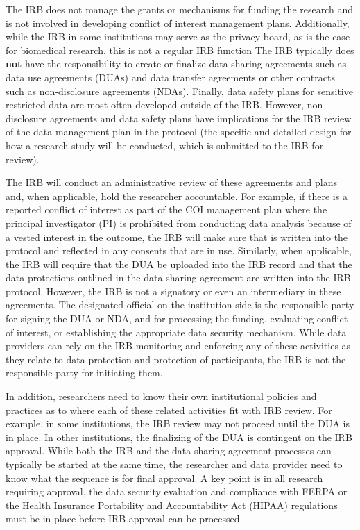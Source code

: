 The IRB does not manage the grants or mechanisms for funding the research and is not involved in developing conflict of interest management plans. Additionally, while the IRB in some institutions may serve as the privacy board, as is the case for biomedical research, this is not a regular IRB function The IRB typically does \textbf{not} have the responsibility to create or finalize data sharing agreements such as data use agreements (DUAs) and data transfer agreements or other contracts such as non-disclosure agreements (NDAs). Finally, data safety plans for sensitive restricted data are most often developed outside of the IRB. However, non-disclosure agreements and data safety plans have implications for the IRB review of the data management plan in the protocol (the specific and detailed design for how a research study will be conducted, which is submitted to the IRB for review).

The IRB will conduct an administrative review of these agreements and plans and, when applicable, hold the researcher accountable. For example, if there is a reported conflict of interest as part of the COI management plan where the principal investigator (PI) is prohibited from conducting data analysis because of a vested interest in the outcome, the IRB will make sure that is written into the protocol and reflected in any consents that are in use. Similarly, when applicable, the IRB will require that the DUA be uploaded into the IRB record and that the data protections outlined in the data sharing agreement are written into the IRB protocol. However, the IRB is not a signatory or even an intermediary in these agreements. The designated official on the institution side is the responsible party for signing the DUA or NDA, and for processing the funding, evaluating conflict of interest, or establishing the appropriate data security mechanism. While data providers can rely on the IRB monitoring and enforcing any of these activities as they relate to data protection and protection of participants, the IRB is not the responsible party for initiating them.

In addition, researchers need to know their own institutional policies and practices as to where each of these related activities fit with IRB review. For example, in some institutions, the IRB review may not proceed until the DUA is in place. In other institutions, the finalizing of the DUA is contingent on the IRB approval. While both the IRB and the data sharing agreement processes can typically be started at the same time, the researcher and data provider need to know what the sequence is for final approval. A key point is in all research requiring approval, the data security evaluation and compliance with FERPA or the Health Insurance Portability and Accountability Act (HIPAA) regulations must be in place before IRB approval can be processed.

